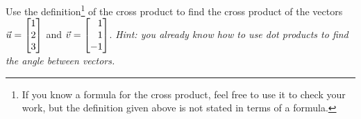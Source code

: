 \begin{enumerate}
			Use the definition\footnote{If you know a formula for the cross product, feel free to
			use it to check your work, but the definition given above is not stated in terms
			of a formula.} of the cross product to
			find the cross product of the vectors $\vec u=\mat{1\\2\\3}$ and $\vec v=\mat{1\\1\\-1}$. \emph{Hint:
			you already know how to use dot products to find the angle between vectors.}
	\end{enumerate}

